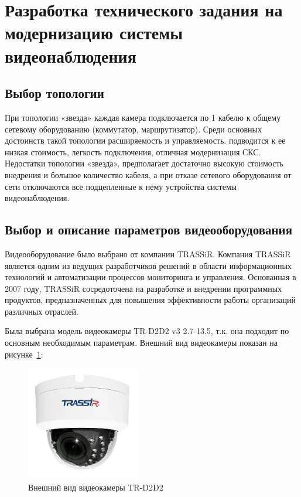 \section{Разработка технического задания на модернизацию системы видеонаблюдения}

\subsection{Выбор топологии}

При топологии «звезда» каждая камера подключается по 1 кабелю к общему сетевому оборудованию (коммутатор, маршрутизатор).
Среди основных достоинств такой топологии расширяемость и управляемость. подводится к ее низкая стоимость, легкость подключения, отличная модернизация СКС.
Недостатки топологии «звезда», предполагает достаточно высокую стоимость внедрения и большое количество кабеля, а при отказе сетевого оборудования от сети 
отключаются все подцепленные к нему устройства системы видеонаблюдения.

\subsection{Выбор и описание параметров видеооборудования}

Видеооборудование было выбрано от компании TRASSiR\@.
Компания TRASSiR является одним из ведущих разработчиков решений в области информационных технологий и автоматизации процессов мониторинга и управления.
Основанная в 2007 году, TRASSiR сосредоточена на разработке и внедрении программных продуктов, предназначенных для повышения эффективности работы организаций различных отраслей.

Была выбрана модель видеокамеры TR-D2D2 v3 2.7-13.5, т.к. она подходит по основным необходимым параметрам.
Внешний вид видеокамеры показан на рисунке~\ref{fig::tr-d2d2}:

\begin{figure}[h]
    \begin{center}
        \includegraphics[width=50mm]{images/TR-D2D2}
    \end{center}
    \captionsetup{justification=centering}
    \caption{Внешний вид видеокамеры TR-D2D2}
    \label{fig::tr-d2d2}
\end{figure}

